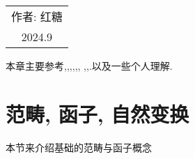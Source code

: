 \begin{flushright}\begin{minipage}{0.3 \textwidth}
	\begin{tabular}{c}
		{作者: \kaishu 红糖} \\
		2024.9  
	\end{tabular}
\end{minipage}\end{flushright}
本章主要参考\cite[7. 一个好用的空间范畴]{李思},\cite[第二章, 第三章]{李文威卷一},\cite[第一章]{李文威卷二},\cite[Chapter 1]{Kerodon},\cite{HTT},\cite[对应词条]{BananaSpace}, \cite[对应词条]{nlab:homepage},\cite{CisinskiFormalization},\cite{陈麟}.以及一些个人理解.

\section{范畴, 函子, 自然变换}

本节来介绍基础的范畴与函子概念
